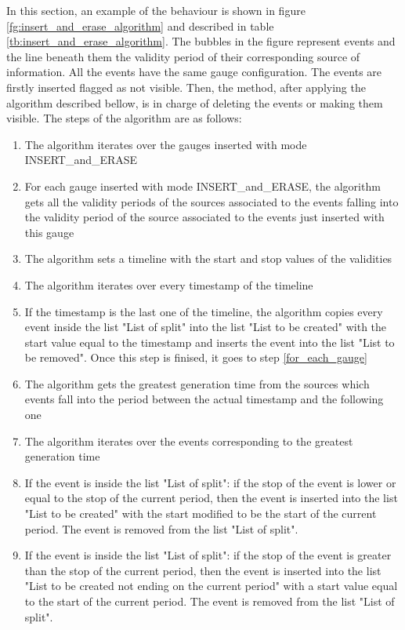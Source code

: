 In this section, an example of the behaviour is shown in figure \ref{fg:insert_and_erase_algorithm} and described in table \ref{tb:insert_and_erase_algorithm}. The bubbles in the figure represent events and the line beneath them the validity period of their corresponding source of information. All the events have the same gauge configuration.
The events are firstly inserted flagged as not visible. Then, the method, after applying the algorithm described bellow, is in charge of deleting the events or making them visible.
The steps of the algorithm are as follows:

\begin{enumerate}

\item The algorithm iterates over the gauges inserted with mode INSERT\_and\_ERASE
\item \label{for_each_gauge} For each gauge inserted with mode INSERT\_and\_ERASE, the algorithm gets all the validity periods of the sources associated to the events falling into the validity period of the source associated to the events just inserted with this gauge
\item The algorithm sets a timeline with the start and stop values of the validities
\item The algorithm iterates over every timestamp of the timeline
\item If the timestamp is the last one of the timeline, the algorithm copies every event inside the list "List of split" into the list "List to be created" with the start value equal to the timestamp and inserts the event into the list "List to be removed". Once this step is finised, it goes to step \ref{for_each_gauge}
\item The algorithm gets the greatest generation time from the sources which events fall into the period between the actual timestamp and the following one
\item The algorithm iterates over the events corresponding to the greatest generation time
\item If the event is inside the list "List of split": if the stop of the event is lower or equal to the stop of the current period, then the event is inserted into the list "List to be created" with the start modified to be the start of the current period. The event is removed from the list "List of split".
\item If the event is inside the list "List of split": if the stop of the event is greater than the stop of the current period, then the event is inserted into the list "List to be created not ending on the current period" with a start value equal to the start of the current period. The event is removed from the list "List of split".

\end{enumerate}
